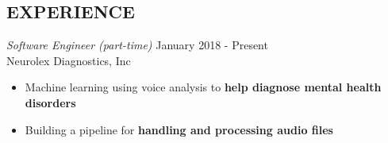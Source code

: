 \documentclass[margin,4pt]{res} %
\begin{document}


\address{
virajosinha@gmail\\
vsinha.com \\
github.com/vsinha
}



\address{1451 20th Ave\\ Seattle, WA 98122\\(408) 505-1275}


\begin{resume}



 
\section{EXPERIENCE} 
	{\sl Software Engineer (part-time)} \hfill January 2018 - Present\\
		Neurolex Diagnostics, Inc
		\begin{itemize} \itemsep -2pt
		\item Machine learning using voice analysis to  \textbf{help diagnose mental health disorders}
		\item Building a pipeline for  \textbf{handling and processing audio files}
		\end{itemize}


\end{resume}
\end{document}
